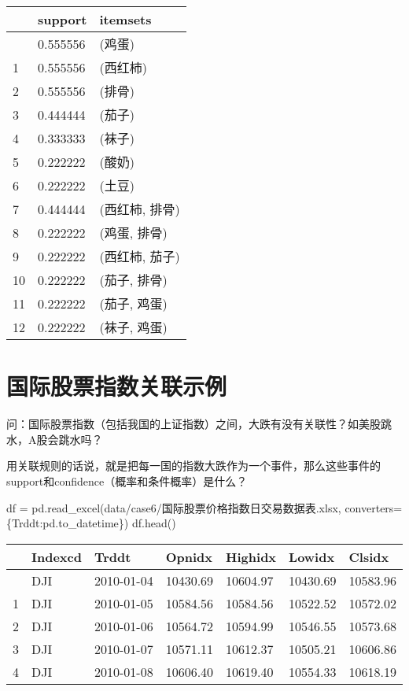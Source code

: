 \documentclass[
  letterpaper,
  DIV=11,
  numbers=noendperiod]{scrreprt}
\newenvironment{Shaded}{\begin{snugshade}}{\end{snugshade}}
\newcommand{\NormalTok}[1]{\textcolor[rgb]{0.00,0.23,0.31}{#1}}
\newcommand{\OperatorTok}[1]{\textcolor[rgb]{0.37,0.37,0.37}{#1}}
\newcommand{\StringTok}[1]{\textcolor[rgb]{0.13,0.47,0.30}{#1}}
\begin{document}
\begin{longtable}[]{@{}lll@{}}
\toprule\noalign{}
& support & itemsets \\
\midrule\noalign{}
\endhead
\bottomrule\noalign{}
\endlastfoot
0 & 0.555556 & (鸡蛋) \\
1 & 0.555556 & (西红柿) \\
2 & 0.555556 & (排骨) \\
3 & 0.444444 & (茄子) \\
4 & 0.333333 & (袜子) \\
5 & 0.222222 & (酸奶) \\
6 & 0.222222 & (土豆) \\
7 & 0.444444 & (西红柿, 排骨) \\
8 & 0.222222 & (鸡蛋, 排骨) \\
9 & 0.222222 & (西红柿, 茄子) \\
10 & 0.222222 & (茄子, 排骨) \\
11 & 0.222222 & (茄子, 鸡蛋) \\
12 & 0.222222 & (袜子, 鸡蛋) \\
\end{longtable}

\hypertarget{ux56fdux9645ux80a1ux7968ux6307ux6570ux5173ux8054ux793aux4f8b}{%
\section{国际股票指数关联示例}\label{ux56fdux9645ux80a1ux7968ux6307ux6570ux5173ux8054ux793aux4f8b}}

问：国际股票指数（包括我国的上证指数）之间，大跌有没有关联性？如美股跳水，A股会跳水吗？

用关联规则的话说，就是把每一国的指数大跌作为一个事件，那么这些事件的support和confidence（概率和条件概率）是什么？

\begin{Shaded}
\begin{Highlighting}[]
\NormalTok{df }\OperatorTok{=}\NormalTok{ pd.read\_excel(}\StringTok{\textquotesingle{}data/case6/国际股票价格指数日交易数据表.xlsx\textquotesingle{}}\NormalTok{,}
\NormalTok{                    converters}\OperatorTok{=}\NormalTok{\{}\StringTok{\textquotesingle{}Trddt\textquotesingle{}}\NormalTok{:pd.to\_datetime\})}
\NormalTok{df.head()}
\end{Highlighting}
\end{Shaded}

\begin{longtable}[]{@{}lllllll@{}}
\toprule\noalign{}
& Indexcd & Trddt & Opnidx & Highidx & Lowidx & Clsidx \\
\midrule\noalign{}
\endhead
\bottomrule\noalign{}
\endlastfoot
0 & DJI & 2010-01-04 & 10430.69 & 10604.97 & 10430.69 & 10583.96 \\
1 & DJI & 2010-01-05 & 10584.56 & 10584.56 & 10522.52 & 10572.02 \\
2 & DJI & 2010-01-06 & 10564.72 & 10594.99 & 10546.55 & 10573.68 \\
3 & DJI & 2010-01-07 & 10571.11 & 10612.37 & 10505.21 & 10606.86 \\
4 & DJI & 2010-01-08 & 10606.40 & 10619.40 & 10554.33 & 10618.19 \\
\end{longtable}
\end{document}

